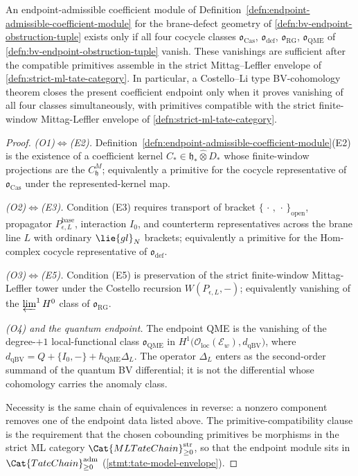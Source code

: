 \begin{prop}
\label{prop:bv-endpoint-obstruction-tuple}
  An endpoint-admissible coefficient module of
  Definition~\ref{defn:endpoint-admissible-coefficient-module} for the
  brane-defect geometry of
  \ref{defn:bv-endpoint-obstruction-tuple} exists only if all
  four cocycle classes
  \(\mathfrak o_{\mathrm{Cas}}\), \(\mathfrak o_{\mathrm{def}}\),
  \(\mathfrak o_{\mathrm{RG}}\), \(\mathfrak o_{\mathrm{QME}}\) of
  \ref{defn:bv-endpoint-obstruction-tuple} vanish.  These vanishings
  are sufficient after the compatible primitives assemble in the
  strict Mittag--Leffler envelope of
  \ref{defn:strict-ml-tate-category}.  In particular, a Costello--Li type
  BV-cohomology theorem closes the present coefficient endpoint only
  when it proves vanishing of all four classes simultaneously, with
  primitives compatible with the strict finite-window Mittag-Leffler
  envelope of \ref{defn:strict-ml-tate-category}.
\end{prop}

\begin{proof}
  \emph{(O1)\(\Leftrightarrow\)(E2).}
  Definition~\ref{defn:endpoint-admissible-coefficient-module}(E2) is
  the existence of a coefficient kernel
  \(C_*\in\mathfrak h_*\widehat\otimes D_*\) whose finite-window
  projections are the \(C^M_{\mathfrak h}\); equivalently a primitive
  for the cocycle representative of
  \(\mathfrak o_{\mathrm{Cas}}\) under the represented-kernel map.

  \emph{(O2)\(\Leftrightarrow\)(E3).}  Condition (E3) requires
  transport of bracket
  \(\{\,\cdot\,,\,\cdot\,\}_{\mathrm{open}}\), propagator
  \(P^{\mathrm{base}}_{\epsilon,L}\), interaction \(I_0\), and
  counterterm representatives across the brane line \(L\) with ordinary
  \(\lie{gl}_N\) brackets; equivalently a primitive for the
  Hom-complex cocycle representative of \(\mathfrak o_{\mathrm{def}}\).

  \emph{(O3)\(\Leftrightarrow\)(E5).}  Condition (E5) is preservation
  of the strict finite-window Mittag-Leffler tower under the Costello
  recursion \(W(P_{\epsilon,L},-)\); equivalently vanishing of the
  \(\varprojlim^1H^0\) class of
  \(\mathfrak o_{\mathrm{RG}}\).

  \emph{(O4) and the quantum endpoint.}  The endpoint QME is the
  vanishing of the degree-\(+1\) local-functional class
  \(\mathfrak o_{\mathrm{QME}}\) in
  \(H^1\bigl(\mathcal O_{\mathrm{loc}}(\mathcal E_w),
  d_{\mathrm{qBV}}\bigr)\), where
  \(d_{\mathrm{qBV}}=Q+\{I_0,-\}+\hbar_{\mathrm{QME}}\Delta_L\).  The operator
  \(\Delta_L\) enters as the second-order summand of the quantum BV
  differential; it is not the differential whose cohomology carries the
  anomaly class.

  Necessity is the same chain of equivalences in reverse: a nonzero
  component removes one of the endpoint data listed above.  The
  primitive-compatibility clause is the requirement that the chosen
  cobounding primitives be morphisms in the strict ML category
  \(\Cat{MLTateChain}_{\geq0}^{\mathrm{str}}\), so that the endpoint
  module sits in
  \(\Cat{TateChain}_{\geq0}^{\mathrm{adm}}\) (\ref{stmt:tate-model-envelope}).
\end{proof}


